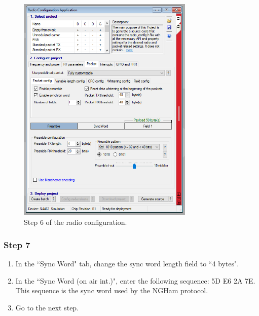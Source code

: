\begin{figure}[!h]
	\begin{center}
		\includegraphics[width=0.75\textwidth]{figures/wds-tutorial/wds-tutorial-6.png}
		\caption{Step 6 of the radio configuration.}
		\label{fig:wds-tutorial-step-6}
	\end{center}
\end{figure}

\subsubsection{Step 7}

\begin{enumerate}
    \item In the ``Sync Word" tab, change the sync word length field to ``4 bytes".
    \item In the ``Sync Word (on air int.)", enter the following sequence: 5D E6 2A 7E. This sequence is the sync word used by the NGHam protocol.
    \item Go to the next step.
\end{enumerate}

